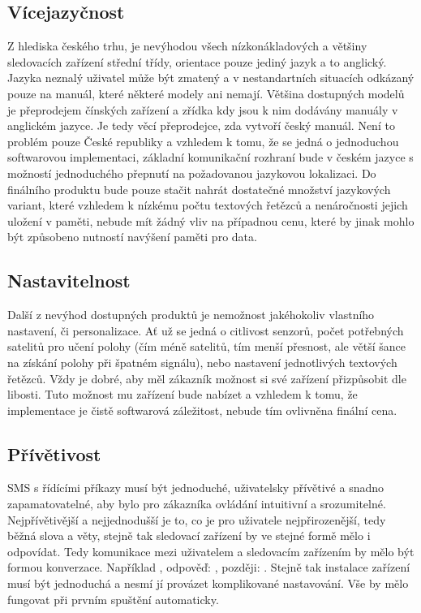 \documentclass[FM,BP]{tulthesis}  %
\begin{document}
\subsection{Vícejazyčnost}
Z hlediska českého trhu, je nevýhodou všech nízkonákladových a většiny sledovacích zařízení střední třídy, orientace pouze jediný jazyk a to anglický. Jazyka neznalý uživatel může být zmatený a v nestandartních situacích odkázaný pouze na manuál, které některé modely ani nemají. Většina dostupných modelů je přeprodejem čínských zařízení a zřídka kdy jsou k nim dodávány manuály v anglickém jazyce. Je tedy věcí přeprodejce, zda vytvoří český manuál. Není to problém pouze České republiky a vzhledem k tomu, že se jedná o jednoduchou softwarovou implementaci, základní komunikační rozhraní bude v českém jazyce s možností jednoduchého přepnutí na požadovanou jazykovou lokalizaci. Do finálního produktu bude pouze stačit nahrát dostatečné množství jazykových variant, které vzhledem k nízkému počtu textových řetězců a nenáročnosti jejich uložení v paměti, nebude mít žádný vliv na případnou cenu, které by jinak mohlo být způsobeno nutností navýšení paměti pro data.

\subsection{Nastavitelnost}
Další z nevýhod dostupných produktů je nemožnost jakéhokoliv vlastního nastavení, či personalizace. Ať už se jedná o citlivost senzorů, počet potřebných satelitů pro učení polohy (čím méně satelitů, tím menší přesnost, ale větší šance na získání polohy při špatném signálu), nebo nastavení jednotlivých textových řetězců. Vždy je dobré, aby měl zákazník možnost si své zařízení přizpůsobit dle libosti. Tuto možnost mu zařízení bude nabízet a vzhledem k tomu, že implementace je čistě softwarová záležitost, nebude tím ovlivněna finální cena.

\subsection{Přívětivost}
SMS s řídícími příkazy musí být jednoduché, uživatelsky přívětivé a snadno zapamatovatelné, aby bylo pro zákazníka ovládání intuitivní a srozumitelné. Nejpřívětivější a nejjednodušší je to, co je pro uživatele nejpřirozenější, tedy běžná slova a věty, stejně tak sledovací zařízení by ve stejné formě mělo i odpovídat. Tedy komunikace mezi uživatelem a sledovacím zařízením by mělo být formou konverzace. Například , odpověď: , později: . Stejně tak instalace zařízení musí být jednoduchá a nesmí jí provázet komplikované nastavování. Vše by mělo fungovat při prvním spuštění automaticky.
\end{document}
